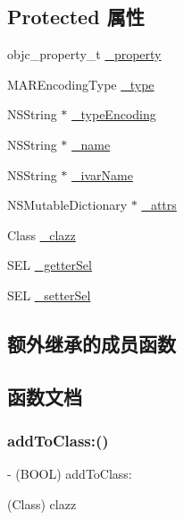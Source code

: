 \subsection*{Protected 属性}
\begin{DoxyCompactItemize}
\item 
objc\+\_\+property\+\_\+t \hyperlink{interface___m_a_r_obj_c_property_a721e5fe1c5a5d818f4385b14955e7faf}{\+\_\+property}
\item 
M\+A\+R\+Encoding\+Type \hyperlink{interface___m_a_r_obj_c_property_a5ea7ca91b231b523b526e56195599f59}{\+\_\+type}
\item 
N\+S\+String $\ast$ \hyperlink{interface___m_a_r_obj_c_property_a44deb81b10271df8569e88f2dc0319c5}{\+\_\+type\+Encoding}
\item 
N\+S\+String $\ast$ \hyperlink{interface___m_a_r_obj_c_property_a766514fcfc6325935f4634e448e24f52}{\+\_\+name}
\item 
N\+S\+String $\ast$ \hyperlink{interface___m_a_r_obj_c_property_a6d0bc006fd86c3b95b5ff21fdb8d5f6c}{\+\_\+ivar\+Name}
\item 
N\+S\+Mutable\+Dictionary $\ast$ \hyperlink{interface___m_a_r_obj_c_property_a67fad0f3957d37b6236ecfb95af74e9c}{\+\_\+attrs}
\item 
Class \hyperlink{interface___m_a_r_obj_c_property_a696cbd94436747021d4d2af256dfa522}{\+\_\+clazz}
\item 
S\+EL \hyperlink{interface___m_a_r_obj_c_property_a1b00a5735288ade11679fa1a161d9184}{\+\_\+getter\+Sel}
\item 
S\+EL \hyperlink{interface___m_a_r_obj_c_property_a79c978e7155180d6ae71738d5042ce12}{\+\_\+setter\+Sel}
\end{DoxyCompactItemize}
\subsection*{额外继承的成员函数}


\subsection{函数文档}
\mbox{\label{interface___m_a_r_obj_c_property_a48f66f3c21b47da3c9edb39f4dcf0c01}} 
\subsubsection{\texorpdfstring{add\+To\+Class\+:()}{addToClass:()}}
{\footnotesize\ttfamily -\/ (B\+O\+OL) add\+To\+Class\+: \begin{DoxyParamCaption}\item[{(Class)}]{clazz }\end{DoxyParamCaption}\hspace{0.3cm}{\ttfamily [implementation]}}



